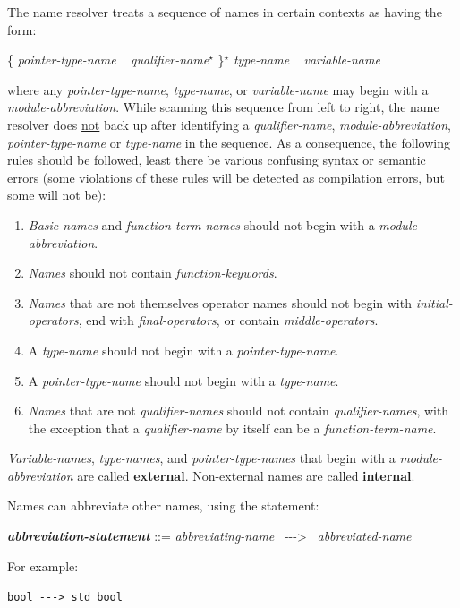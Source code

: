 \documentclass[12pt]{article}
\newcommand{\STAR}{{\Large $^\star$}}
\newcommand{\ABV}{-{}-{}->}
\newcommand{\key}[1]{{\rm \bfseries #1}}
\newcommand{\emkey}[1]{{\em \bfseries #1}}
\newenvironment{indpar}[1][0.3in]%
	{\begin{list}{}%
		     {\setlength{\itemsep}{0in}%
		      \setlength{\topsep}{0in}%
		      \setlength{\parsep}{1ex}%
		      \setlength{\labelwidth}{#1}%
		      \setlength{\leftmargin}{#1}%
		      \addtolength{\leftmargin}{\labelsep}}%
	 \item}%
	{\end{list}}
\begin{document}
The name resolver treats a sequence of
names in certain contexts as having the form:
\begin{center}
\{ {\em pointer-type-name} ~ {\em qualifier-name}\STAR{} \}\STAR{}
{\em type-name} ~ {\em variable-name}
\end{center}
where any {\em pointer-type-name}, {\em type-name}, or {\em variable-name}
may begin with a {\em module-abbre\-via\-tion}.
While scanning this sequence from left to right,
the name resolver does \underline{not} back up after identifying
a {\em qualifier-name}, {\em module-abbreviation}, {\em pointer-type-name}
or {\em type-name} in the sequence.  As a consequence, the
following rules should be followed, least there be
various confusing syntax or semantic errors (some
violations of these rules will be detected as compilation errors,
but some will not be):
\begin{enumerate}
\item\label{MODULE-ABBREVIATION-RULE}
{\em Basic-names} and {\em function-term-names}
should not begin with a {\em module-abbre\-viation}.
\item\label{FUNCTION-KEYWORD-RULE}
{\em Names} should not contain {\em function-keywords}.
\item\label{OPERATOR-RULE}
{\em Names} that are not themselves operator names should not
begin with {\em initial-operators},
end with {\em final-operators}, or contain {\em middle-operators}.
\item\label{TYPE-NAME-RULE}
A {\em type-name} should not begin with a {\em pointer-type-name}.
\item\label{POINTER-TYPE-NAME-RULE}
A {\em pointer-type-name} should not begin with a {\em type-name}.
\item\label{QUALIFIER-RULE}
{\em Names} that are not {\em qualifier-names}
should not contain {\em qualifier-names}, with the
exception that a {\em qualifier-name} by itself can be
a {\em function-term-name}.
\end{enumerate}

{\em Variable-names}, {\em type-names}, and {\em pointer-type-names}
that begin with a {\em module-abbreviation} are called
\key{external}\label{EXTERNAL-NAME}.
Non-external names are called \key{internal}\label{INTERNAL-NAME}.

Names can abbreviate other names, using the statement:
\begin{indpar}
\emkey{abbreviation-statement}\label{ABBREVIATION-STATEMENT} ::=
    {\em abbreviating-name}~ \ABV{}~ {\em abbreviated-name}
\end{indpar}
For example:
\begin{center}
\tt bool \ABV{} std bool
\end{center}
\end{document}
